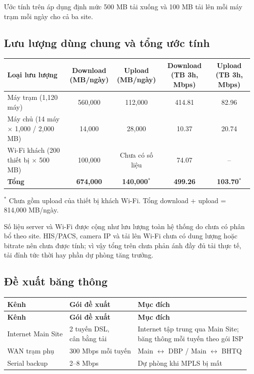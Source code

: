 Ước tính trên áp dụng định mức 500 MB tải xuống và 100 MB tải lên mỗi máy trạm mỗi ngày cho cả ba site.

\subsection{Lưu lượng dùng chung và tổng ước tính}

\begin{tabularx}{\textwidth}{|>{\raggedright\arraybackslash}X|c|c|c|c|}
\hline
\textbf{Loại lưu lượng} & \shortstack{\textbf{Download}\\\textbf{(MB/ngày)}} & \shortstack{\textbf{Upload}\\\textbf{(MB/ngày)}} & \shortstack{\textbf{Download}\\\textbf{(TB 3h, Mbps)}} & \shortstack{\textbf{Upload}\\\textbf{(TB 3h, Mbps)}} \\
\hline
Máy trạm (1,120 máy) & 560,000 & 112,000 & 414.81 & 82.96 \\
\hline
Máy chủ (14 máy $\times$ 1,000 / 2,000 MB) & 14,000 & 28,000 & 10.37 & 20.74 \\
\hline
Wi-Fi khách (200 thiết bị $\times$ 500 MB) & 100,000 & Chưa có số liệu & 74.07 & -- \\
\hline
\textbf{Tổng} & \textbf{674,000} & \textbf{140,000$^{*}$} & \textbf{499.26} & \textbf{103.70$^{*}$} \\
\hline
\end{tabularx}

{\small $^{*}$ Chưa gồm upload của thiết bị khách Wi-Fi. Tổng download + upload = 814,000 MB/ngày.}

Số liệu server và Wi-Fi được cộng như lưu lượng toàn hệ thống do chưa có phân bổ theo site. HIS/PACS, camera IP và tải lên Wi-Fi chưa có dung lượng hoặc bitrate nên chưa được tính; vì vậy tổng trên chưa phản ánh đầy đủ tải thực tế, tải đỉnh tức thời hay phần dự phòng tăng trưởng.

\subsection{Đề xuất băng thông}

\begin{longtable}{@{}|l|l|l|@{}}
\hline
\textbf{Kênh} & \textbf{Gói đề xuất} & \textbf{Mục đích} \\
\hline
\endfirsthead
\hline
\textbf{Kênh} & \textbf{Gói đề xuất} & \textbf{Mục đích} \\
\hline
\endhead
Internet Main Site & \shortstack[l]{2 tuyến DSL,\\cân bằng tải} & \shortstack[l]{Internet tập trung qua Main Site;\\băng thông mỗi tuyến theo gói ISP} \\
WAN trạm phụ & 300 Mbps mỗi tuyến & Main \(\leftrightarrow\) DBP / Main \(\leftrightarrow\) BHTQ \\
Serial backup & 2--8 Mbps & Dự phòng khi MPLS bị mất \\
\hline
\end{longtable}

